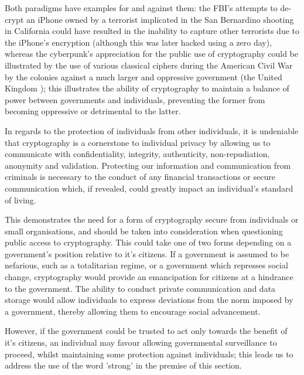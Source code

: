 \documentclass[british,10pt,a4paper]{article}
\begin{document}
Both paradigms have examples for and against them: the FBI's attempts to de-crypt an iPhone owned by a terrorist implicated in the San Bernardino shooting in California could have resulted in the inability to capture other terrorists due to the iPhone's encryption (although this was later hacked using a zero day), whereas the cyberpunk's appreciation for the public use of cryptography could be illustrated by the use of various classical ciphers during the American Civil War by the colonies against a much larger and oppressive government (the United Kingdom \cite{us_cipher}); this illustrates the ability of cryptography to maintain a balance of power between governments and individuals, preventing the former from becoming oppressive or detrimental to the latter.

In regards to the protection of individuals from other individuals, it is undeniable that cryptography is a cornerstone to individual privacy by allowing us to communicate with confidentiality, integrity, authenticity, non-repudiation, anonymity and validation. Protecting our information and communication from criminals is necessary to the conduct of any financial transactions or secure communication which, if revealed, could greatly impact an individual's standard of living. 

This demonstrates the need for a form of cryptography secure from individuals or small organisations, and should be taken into consideration when questioning public access to cryptography. This could take one of two forms depending on a government's position relative to it's citizens. If a government is assumed to be nefarious, such as a totalitarian regime, or a government which represses social change, cryptography would provide an emancipation for citizens at a hindrance to the government. The ability to conduct private communication and data storage would allow individuals to express deviations from the norm imposed by a government, thereby allowing them to encourage social advancement.

However, if the government could be trusted to act only towards the benefit of it's citizens, an individual may favour allowing governmental surveillance to proceed, whilst maintaining some protection against individuals; this leads us to address the use of the word 'strong' in the premise of this section.
\end{document}
